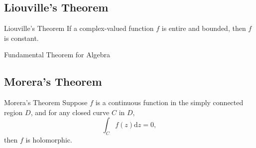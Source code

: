 \subsection{Liouville's Theorem}

\begin{theorem}{Liouville's Theorem}{}
  If a complex-valued function $f$ is entire and bounded, then $f$ is constant.
\end{theorem}

\begin{corollary}{Fundamental Theorem for Algebra}{}
  
\end{corollary}


\subsection{Morera's Theorem}

\begin{theorem}{Morera's Theorem}{}
  Suppose $f$ is a continuous function in the simply connected region $D$,
  and for any closed curve $C$ in $D$,
  \begin{equation}
    \int_C f(z)\mathrm{d} z = 0,
  \end{equation}
  then $f$ is holomorphic.
\end{theorem}


